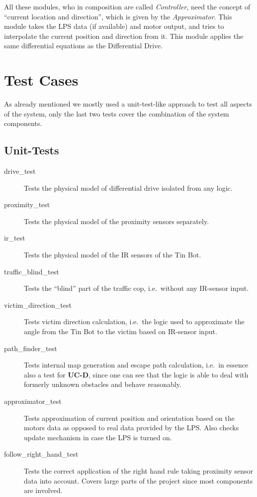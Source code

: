\documentclass[a4paper,parskip,headheight=38pt]{scrartcl} %
\begin{document}
All these modules, who in composition are called \emph{Controller}, need the concept of \enquote{current location and direction}, which is given by the \emph{Approximator}. This module takes the LPS data (if available) and motor output, and tries to interpolate the current position and direction from it. This module applies the same differential equations as the Differential Drive.

\section{Test Cases}
As already mentioned we mostly used a unit-test-like approach to test all aspects of the system, only the last two tests cover the combination of the system components.

\subsection{Unit-Tests}
\begin{description}
\item[drive\_test] Tests the physical model of differential drive isolated from any logic.
\item[proximity\_test] Tests the physical model of the proximity sensors separately. %
\item[ir\_test] Tests the physical model of the IR sensors of the Tin Bot.
\item[traffic\_blind\_test] Tests the \enquote{blind} part of the traffic cop, i.e.\ without any IR-sensor input.
\item[victim\_direction\_test] Tests victim direction calculation, i.e.\ the logic used to approximate the angle from the Tin Bot to the victim based on IR-sensor input.
\item[path\_finder\_test] Tests internal map generation and escape path calculation, i.e.\ in essence also a test for \textbf{UC-D}, since one can see that the logic is able to deal with formerly unknown obstacles and behave reasonably.
\item[approximator\_test] Tests approximation of current position and orientation based on the motors data as opposed to real data provided by the LPS. Also checks update mechanism in case the LPS is turned on.
\item[follow\_right\_hand\_test] Tests the correct application of the right hand rule taking proximity sensor data into account. Covers large parts of the project since most components are involved.
\end{description}
\end{document}
